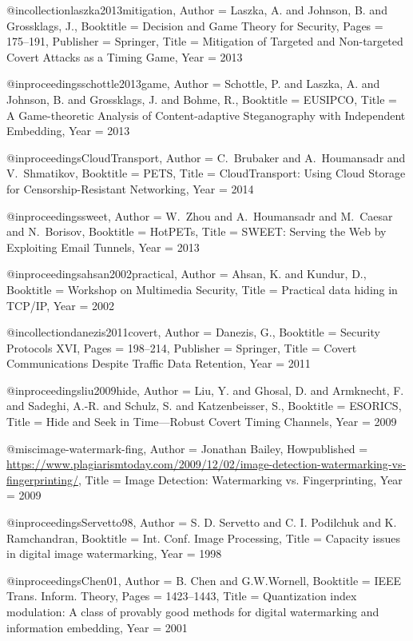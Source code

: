{{{{{	@incollection{laszka2013mitigation,
	Author = {Laszka, A. and Johnson, B. and Grossklags, J.},
	Booktitle = {Decision and Game Theory for Security},
	Pages = {175--191},
	Publisher = {Springer},
	Title = {{Mitigation of Targeted and Non-targeted Covert Attacks as a Timing Game}},
	Year = {2013}}
	
	@inproceedings{schottle2013game,
	Author = {Schottle, P. and Laszka, A. and Johnson, B. and Grossklags, J. and Bohme, R.},
	Booktitle = {EUSIPCO},
	Title = {{A Game-theoretic Analysis of Content-adaptive Steganography with Independent Embedding}},
	Year = {2013}}
	
	@inproceedings{CloudTransport,
	Author = {C.~Brubaker and A.~Houmansadr and V.~Shmatikov},
	Booktitle = {PETS},
	Title = {{CloudTransport: Using Cloud Storage for Censorship-Resistant Networking}},
	Year = {2014}}
	
	@inproceedings{sweet,
	Author = {W.~Zhou and A.~Houmansadr and M.~Caesar and N.~Borisov},
	Booktitle = {HotPETs},
	Title = {{SWEET: Serving the Web by Exploiting Email Tunnels}},
	Year = {2013}}
	
	@inproceedings{ahsan2002practical,
	Author = {Ahsan, K. and Kundur, D.},
	Booktitle = {Workshop on Multimedia Security},
	Title = {{Practical data hiding in TCP/IP}},
	Year = {2002}}
	
	@incollection{danezis2011covert,
	Author = {Danezis, G.},
	Booktitle = {Security Protocols XVI},
	Pages = {198--214},
	Publisher = {Springer},
	Title = {{Covert Communications Despite Traffic Data Retention}},
	Year = {2011}}
	
	@inproceedings{liu2009hide,
	Author = {Liu, Y. and Ghosal, D. and Armknecht, F. and Sadeghi, A.-R. and Schulz, S. and Katzenbeisser, S.},
	Booktitle = {ESORICS},
	Title = {{Hide and Seek in Time---Robust Covert Timing Channels}},
	Year = {2009}}
	
	@misc{image-watermark-fing,
	Author = {Jonathan Bailey},
	Howpublished = {\url{https://www.plagiarismtoday.com/2009/12/02/image-detection-watermarking-vs-fingerprinting/}},
	Title = {{Image Detection: Watermarking vs. Fingerprinting}},
	Year = {2009}}
	
	@inproceedings{Servetto98,
	Author = {S. D. Servetto and C. I. Podilchuk and K. Ramchandran},
	Booktitle = {Int. Conf. Image Processing},
	Title = {Capacity issues in digital image watermarking},
	Year = {1998}}
	
	@inproceedings{Chen01,
	Author = {B. Chen and G.W.Wornell},
	Booktitle = {IEEE Trans. Inform. Theory},
	Pages = {1423--1443},
	Title = {Quantization index modulation: A class of provably good methods for digital watermarking and information embedding},
	Year = {2001}}
	
}}}}}
